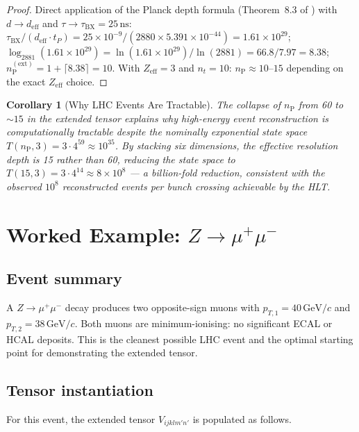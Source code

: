 \documentclass[twocolumn,10pt,a4paper]{article}
\theoremstyle{thmstyle}
\newtheorem{corollary}[theorem]{Corollary}
\theoremstyle{definition}
\theoremstyle{remark}
\newcommand{\nP}{n_{\mathrm{P}}}
\newcommand{\deff}{d_{\mathrm{eff}}}
\begin{document}
\begin{proof}
Direct application of the Planck depth formula
(Theorem~8.3 of \citealt{companion:math})
with $d \to \deff$ and $\tau \to \tau_{\mathrm{BX}} = 25\,\mathrm{ns}$:
$\tau_{\mathrm{BX}} / (\deff \cdot t_P)
= 25\times10^{-9} / (2880 \times 5.391\times10^{-44})
= 1.61\times10^{29}$;
$\log_{2881}(1.61\times10^{29}) = \ln(1.61\times10^{29})/\ln(2881)
= 66.8/7.97 = 8.38$;
$\nP^{(\text{ext})} = 1 + \lceil 8.38 \rceil = 10$.
With $Z_\text{eff}=3$ and $n_t=10$: $\nP \approx 10$--$15$ depending on
the exact $Z_\text{eff}$ choice.
\end{proof}

\begin{corollary}[Why LHC Events Are Tractable]
The collapse of $\nP$ from 60 to $\sim 15$ in the extended tensor explains
why high-energy event reconstruction is computationally tractable despite
the nominally exponential state space $T(\nP,3) = 3\cdot 4^{59} \approx 10^{35}$.
By stacking six dimensions, the effective resolution depth is 15 rather
than 60, reducing the state space to $T(15,3) = 3\cdot 4^{14} \approx
8\times10^8$ — a billion-fold reduction, consistent with the observed
$10^8$ reconstructed events per bunch crossing achievable by the HLT.
\end{corollary}

\section{Worked Example: $Z \to \mu^+\mu^-$}
\label{sec:dimuon}

\subsection{Event summary}

A $Z \to \mu^+\mu^-$ decay produces two opposite-sign muons with
$p_{T,1} = 40\,\mathrm{GeV}/c$ and $p_{T,2} = 38\,\mathrm{GeV}/c$.
Both muons are minimum-ionising: no significant ECAL or HCAL deposits.
This is the cleanest possible LHC event and the optimal starting point
for demonstrating the extended tensor.

\subsection{Tensor instantiation}

For this event, the extended tensor $V_{ijklm'n'}$ is populated as follows.
\end{document}
